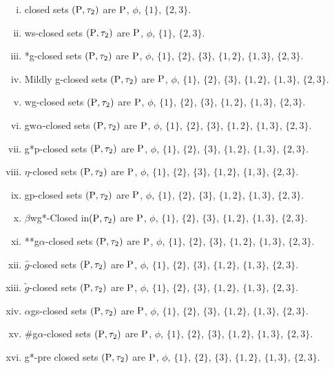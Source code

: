 \begin{exm}
\begin{enumerate}[(i)]
\item closed sets $(\mathrm{P}, \tau_{2})$ are $\mathrm{P}$, $\phi$, $\{1\}$, $\{2, 3\}$.
\item ws-closed sets $(\mathrm{P}, \tau_{2})$ are $\mathrm{P}$, $\phi$, $\{1\}$, $\{2, 3\}$.
\item *g-closed sets $(\mathrm{P}, \tau_{2})$ are $\mathrm{P}$, $\phi$, $\{1\}$, $\{2\}$, $\{3\}$, $\{1, 2\}$, $\{1, 3\}$, $\{2, 3\}$.
\item Mildly g-closed sets $(\mathrm{P}, \tau_{2})$ are $\mathrm{P}$, $\phi$, $\{1\}$, $\{2\}$, $\{3\}$, $\{1, 2\}$, $\{1, 3\}$, $\{2, 3\}$.
\item wg-closed sets $(\mathrm{P}, \tau_{2})$ are $\mathrm{P}$, $\phi$, $\{1\}$, $\{2\}$, $\{3\}$, $\{1, 2\}$, $\{1, 3\}$, $\{2, 3\}$.
\item gw$\alpha$-closed sets $(\mathrm{P}, \tau_{2})$ are $\mathrm{P}$, $\phi$, $\{1\}$, $\{2\}$, $\{3\}$, $\{1, 2\}$, $\{1, 3\}$, $\{2, 3\}$.
\item g*p-closed sets $(\mathrm{P}, \tau_{2})$ are $\mathrm{P}$, $\phi$, $\{1\}$, $\{2\}$, $\{3\}$, $\{1, 2\}$, $\{1, 3\}$, $\{2, 3\}$.
\item $\eta$-closed sets $(\mathrm{P}, \tau_{2})$ are $\mathrm{P}$, $\phi$, $\{1\}$, $\{2\}$, $\{3\}$, $\{1, 2\}$, $\{1, 3\}$, $\{2, 3\}$.
\item gp-closed sets $(\mathrm{P}, \tau_{2})$ are $\mathrm{P}$, $\phi$, $\{1\}$, $\{2\}$, $\{3\}$, $\{1, 2\}$, $\{1, 3\}$, $\{2, 3\}$.
\item $\beta$wg*-Closed in$(\mathrm{P}, \tau_{2})$ are $\mathrm{P}$, $\phi$, $\{1\}$, $\{2\}$, $\{3\}$, $\{1, 2\}$, $\{1, 3\}$, $\{2, 3\}$.
\item {*}{*}g$\alpha$-closed sets $(\mathrm{P}, \tau_{2})$ are $\mathrm{P}$, $\phi$, $\{1\}$, $\{2\}$, $\{3\}$, $\{1, 2\}$, $\{1, 3\}$, $\{2, 3\}$.
\item $\hat{g}$-closed sets $(\mathrm{P}, \tau_{2})$ are $\mathrm{P}$, $\phi$, $\{1\}$, $\{2\}$, $\{3\}$, $\{1, 2\}$, $\{1, 3\}$, $\{2, 3\}$.
\item $\tilde{g}$-closed sets $(\mathrm{P}, \tau_{2})$ are $\mathrm{P}$, $\phi$, $\{1\}$, $\{2\}$, $\{3\}$, $\{1, 2\}$, $\{1, 3\}$, $\{2, 3\}$.
\item $\alpha$gs-closed sets $(\mathrm{P}, \tau_{2})$ are $\mathrm{P}$, $\phi$, $\{1\}$, $\{2\}$, $\{3\}$, $\{1, 2\}$, $\{1, 3\}$, $\{2, 3\}$.
\item \#g$\alpha$-closed sets $(\mathrm{P}, \tau_{2})$ are $\mathrm{P}$, $\phi$, $\{1\}$, $\{2\}$, $\{3\}$, $\{1, 2\}$, $\{1, 3\}$, $\{2, 3\}$.
\item g*-pre closed sets $(\mathrm{P}, \tau_{2})$ are $\mathrm{P}$, $\phi$, $\{1\}$, $\{2\}$, $\{3\}$, $\{1, 2\}$, $\{1, 3\}$, $\{2, 3\}$.

\end{enumerate}
\end{exm}
